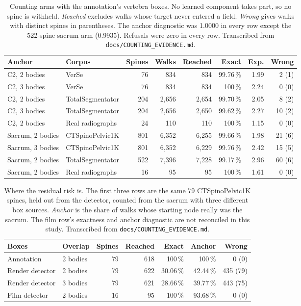 \documentclass[11pt,letterpaper]{article}
\begin{document}
\begin{table}[htbp]\centering\small
\caption{Counting arms with the annotation's vertebra boxes. No learned component takes part, so no spine is
withheld. \emph{Reached} excludes walks whose target never entered a field. \emph{Wrong} gives walks with
distinct spines in parentheses. The anchor diagnostic was 1.0000 in every row except the 522-spine sacrum
arm (0.9935). Refusals were zero in every row. Transcribed from \texttt{docs/COUNTING\_EVIDENCE.md}.}
\label{tab:count}
\begin{tabular}{llrrrrrr}
\toprule
Anchor & Corpus & Spines & Walks & Reached & Exact & Exp. & Wrong \\
\midrule
C2, 2 bodies      & VerSe               & 76  & 834   & 834   & 99.76\,\%  & 1.99 & 2 (1) \\
C2, 3 bodies      & VerSe               & 76  & 834   & 834   & 100\,\%    & 2.24 & 0 (0) \\
C2, 2 bodies      & TotalSegmentator    & 204 & 2,656 & 2,654 & 99.70\,\%  & 2.05 & 8 (2) \\
C2, 3 bodies      & TotalSegmentator    & 204 & 2,656 & 2,650 & 99.62\,\%  & 2.27 & 10 (2) \\
C2, 2 bodies      & Real radiographs    & 24  & 110   & 110   & 100\,\%    & 1.15 & 0 (0) \\
\midrule
Sacrum, 2 bodies  & CTSpinoPelvic1K     & 801 & 6,352 & 6,255 & 99.66\,\%  & 1.98 & 21 (6) \\
Sacrum, 3 bodies  & CTSpinoPelvic1K     & 801 & 6,352 & 6,229 & 99.76\,\%  & 2.42 & 15 (5) \\
Sacrum, 2 bodies  & TotalSegmentator    & 522 & 7,396 & 7,228 & 99.17\,\%  & 2.96 & 60 (6) \\
Sacrum, 2 bodies  & Real radiographs    & 16  & 95    & 95    & 100\,\%    & 1.61 & 0 (0) \\
\bottomrule
\end{tabular}
\end{table}

\begin{table}[htbp]\centering\small
\caption{Where the residual risk is. The first three rows are the same 79 CTSpinoPelvic1K spines, held out
from the detector, counted from the sacrum with three different box sources. \emph{Anchor} is the share of
walks whose starting node really was the sacrum. The film row's exactness and anchor diagnostic are not
reconciled in this study. Transcribed from \texttt{docs/COUNTING\_EVIDENCE.md}.}
\label{tab:boxes}
\begin{tabular}{llrrrrr}
\toprule
Boxes & Overlap & Spines & Reached & Exact & Anchor & Wrong \\
\midrule
Annotation        & 2 bodies & 79 & 618 & 100\,\%   & 100\,\%   & 0 (0) \\
Render detector   & 2 bodies & 79 & 622 & 30.06\,\% & 42.44\,\% & 435 (79) \\
Render detector   & 3 bodies & 79 & 621 & 28.66\,\% & 39.77\,\% & 443 (75) \\
\midrule
Film detector     & 2 bodies & 16 & 95  & 100\,\%   & 93.68\,\% & 0 (0) \\
\bottomrule
\end{tabular}
\end{table}
\end{document}
